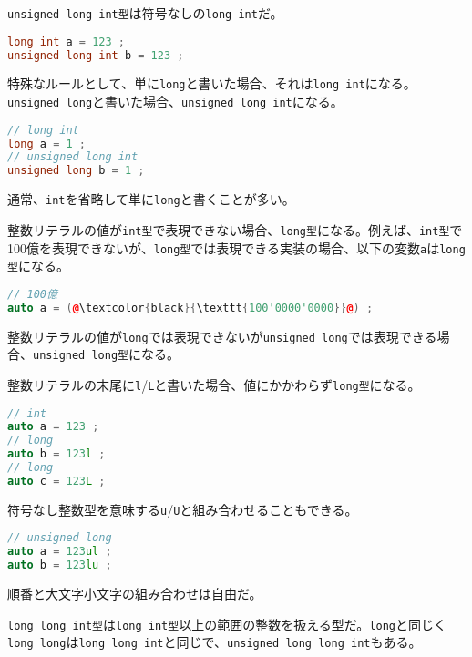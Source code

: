 \texttt{unsigned long int型}は符号なしの\texttt{long int}だ。

\begin{lstlisting}[language={C++}]
long int a = 123 ;
unsigned long int b = 123 ;
\end{lstlisting}

特殊なルールとして、単に\texttt{long}と書いた場合、それは\texttt{long int}になる。\texttt{unsigned long}と書いた場合、\texttt{unsigned long int}になる。

\begin{lstlisting}[language={C++}]
// long int
long a = 1 ;
// unsigned long int
unsigned long b = 1 ;
\end{lstlisting}

通常、\texttt{int}を省略して単に\texttt{long}と書くことが多い。

整数リテラルの値が\texttt{int型}で表現できない場合、\texttt{long型}になる。例えば、\texttt{int型}で100億を表現できないが、\texttt{long型}では表現できる実装の場合、以下の変数\texttt{a}は\texttt{long型}になる。

\begin{lstlisting}[language={C++}]
// 100億
auto a = (@\textcolor{black}{\texttt{100'0000'0000}}@) ;
\end{lstlisting}

整数リテラルの値が\texttt{long}では表現できないが\texttt{unsigned long}では表現できる場合、\texttt{unsigned long型}になる。

整数リテラルの末尾に\texttt{l}/\texttt{L}と書いた場合、値にかかわらず\texttt{long型}になる。

\begin{lstlisting}[language={C++}]
// int
auto a = 123 ;
// long
auto b = 123l ;
// long
auto c = 123L ;
\end{lstlisting}

符号なし整数型を意味する\texttt{u}/\texttt{U}と組み合わせることもできる。

\begin{lstlisting}[language={C++}]
// unsigned long
auto a = 123ul ;
auto b = 123lu ;
\end{lstlisting}

順番と大文字小文字の組み合わせは自由だ。


\texttt{long long int型}は\texttt{long int型}以上の範囲の整数を扱える型だ。\texttt{long}と同じく\texttt{long long}は\texttt{long long int}と同じで、\texttt{unsigned long long int}もある。

